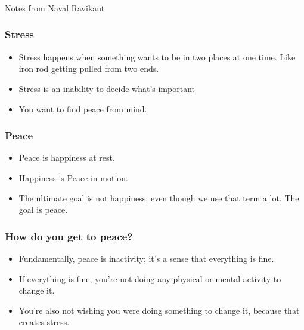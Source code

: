 \begin{frame}[fragile]\frametitle{}
\begin{center}
{\Large Notes from Naval Ravikant}

\end{center}
\end{frame}

\begin{frame}[fragile]\frametitle{Stress}

	\begin{itemize}
	\item Stress happens when something wants to be in two places at one time. Like iron rod getting pulled from two ends.
	\item Stress is an inability to decide what’s important
	\item You want to find peace from mind. 
	\end{itemize}

\end{frame}

\begin{frame}[fragile]\frametitle{Peace}

	\begin{itemize}
	\item Peace is happiness at rest.
	\item Happiness is Peace in motion.
	\item The ultimate goal is not happiness, even though we use that term a lot. The goal is peace.
	\end{itemize}

\end{frame}

\begin{frame}[fragile]\frametitle{How do you get to peace?}

	\begin{itemize}
	\item Fundamentally, peace is inactivity; it’s a sense that everything is fine.
	\item If everything is fine, you’re not doing any physical or mental activity to change it. 
	\item You’re also not wishing you were doing something to change it, because that creates stress. 
	\end{itemize}

\end{frame}

